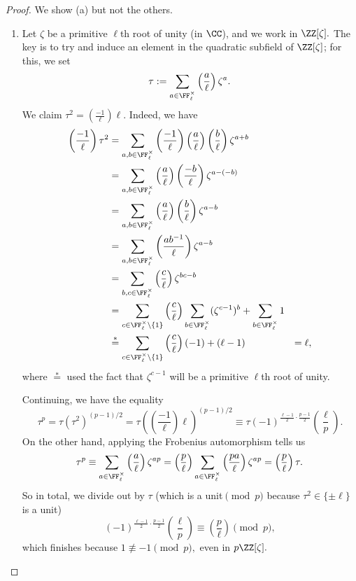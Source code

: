 \begin{proof}
	We show (a) but not the others.
	\begin{enumerate}[label=(\alph*)]
		\item Let $\zeta$ be a primitive $\ell$th root of unity (in $\CC$), and we work in $\ZZ[\zeta].$ The key is to try and induce an element in the quadratic subfield of $\ZZ[\zeta]$; for this, we set
		\[\tau:=\sum_{a\in\FF_\ell^\times}\left(\frac a\ell\right)\zeta^a.\]
		We claim $\tau^2=\left(\frac{-1}\ell\right)\ell.$ Indeed, we have
		\begin{align*}
			\left(\frac{-1}\ell\right)\tau^2 &= \sum_{a,b\in\FF_\ell^\times}\left(\frac{-1}\ell\right)\left(\frac a\ell\right)\left(\frac b\ell\right)\zeta^{a+b} \\
			&= \sum_{a,b\in\FF_\ell^\times}\left(\frac {a}\ell\right)\left(\frac {-b}\ell\right)\zeta^{a-(-b)} \\
			&= \sum_{a,b\in\FF_\ell^\times}\left(\frac {a}\ell\right)\left(\frac b\ell\right)\zeta^{a-b} \\
			&= \sum_{a,b\in\FF_\ell^\times}\left(\frac {ab^{-1}}\ell\right)\zeta^{a-b} \\
			&= \sum_{b,c\in\FF_\ell^\times}\left(\frac c\ell\right)\zeta^{bc-b} \\
			&= \sum_{c\in\FF_\ell^\times\setminus\{1\}}\left(\frac c\ell\right)\sum_{b\in\FF_\ell^\times}(\zeta^{c-1})^b+\sum_{b\in\FF_\ell^\times}1 \\
			&\stackrel*= \sum_{c\in\FF_\ell^\times\setminus\{1\}}\left(\frac c\ell\right)(-1)+(\ell-1)
			&= \ell,
		\end{align*}
		where $\stackrel*=$ used the fact that $\zeta^{c-1}$ will be a primitive $\ell$th root of unity.

		Continuing, we have the equality
		\[\tau^p=\tau\left(\tau^2\right)^{(p-1)/2}=\tau\left(\left(\frac{-1}\ell\right)\ell\right)^{(p-1)/2}\equiv\tau(-1)^{\frac{\ell-1}2\cdot\frac{p-1}2}\left(\frac\ell p\right).\]
		On the other hand, applying the Frobenius automorphism tells us
		\[\tau^p\equiv\sum_{a\in\FF_\ell^\times}\left(\frac a\ell\right)\zeta^{ap}=\left(\frac p\ell\right)\sum_{a\in\FF_\ell^\times}\left(\frac{pa}\ell\right)\zeta^{ap}=\left(\frac p\ell\right)\tau.\]
		So in total, we divide out by $\tau$ (which is a unit$\pmod p$ because $\tau^2\in\{\pm\ell\}$ is a unit)
		\[(-1)^{\frac{\ell-1}2\cdot\frac{p-1}2}\left(\frac\ell p\right)\equiv\left(\frac p\ell\right)\pmod p,\]
		which finishes because $1\not\equiv-1\pmod p,$ even in $p\ZZ[\zeta].$
		\qedhere
	\end{enumerate}
\end{proof}